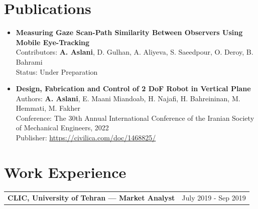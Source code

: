 \documentclass[a4paper,10pt]{article}
\begin{document}
\vspace{\baselineskip} 


\section{Publications}

\begin{itemize}
    \item \textbf{Measuring Gaze Scan-Path Similarity Between Observers Using Mobile Eye-Tracking}\\
    Contributors: \textbf{A. Aslani}, D. Gulhan, A. Aliyeva, S. Saeedpour, O. Deroy, B. Bahrami\\
    Status: Under Preparation
\end{itemize}


\begin{itemize}
    \item \textbf{Design, Fabrication and Control of 2 DoF Robot in Vertical Plane}\\
    Authors: \textbf{A. Aslani}, E. Maani Miandoab, H. Najafi, H. Bahreininan, M. Hemmati, M. Fakher\\
    Conference: The 30th Annual International Conference of the Iranian Society of Mechanical Engineers, 2022\\
    Publisher:  \href{https://civilica.com/doc/1468825/}{https://civilica.com/doc/1468825/}
\end{itemize}

\vspace{\baselineskip} 




\section{Work Experience}

\begin{tabularx}{\linewidth}{@{}X r@{}}
    \textbf{CLIC, University of Tehran — Market Analyst} & \hfill July 2019 - Sep 2019 \\[3.75pt]
\end{tabularx}
\end{document}
